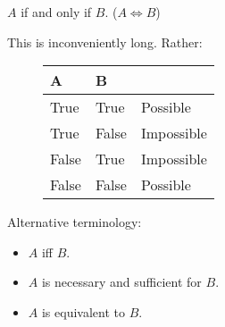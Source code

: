 \documentclass{beamer}
\begin{document}
\begin{frame}{$A$ if and only if $B$. ($A\Leftrightarrow B$)}
\begin{block}{}
\end{block}
This is inconveniently long. Rather:
\begin{block}{}
\end{block}

\begin{figure}
\centering
\begin{tabular}{| >{\centering\arraybackslash}b{1in} | >{\centering\arraybackslash}b{1in} || >{\centering\arraybackslash}b{1in}|}
\hline
A& B & \\
\hline
True & True & Possible\\
True & False& Impossible\\
False & True & Impossible\\
False & False & Possible\\
\hline
\end{tabular}
\end{figure}
Alternative terminology:
\begin{itemize}
\item $A$ iff $B$.\pause
\item $A$ is necessary and sufficient for $B$.\pause
\item $A$ is equivalent to $B$.
\end{itemize}
\end{frame}
\end{document}
